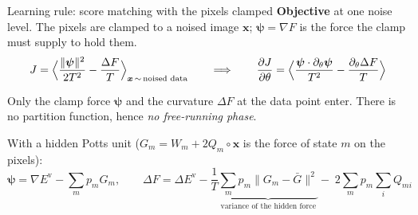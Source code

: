 \documentclass[aspectratio=169,10pt]{beamer}
\newcommand{\x}{\bm{x}}
\begin{document}
\begin{frame}{Learning rule: score matching with the pixels clamped}
  \textbf{Objective} at one noise level. The pixels are clamped to a noised image $\x$;
  $\bm\psi=\nabla F$ is the force the clamp must supply to hold them.
  \[
    J=\Bigl\langle\frac{\lVert\bm\psi\rVert^{2}}{2T^{2}}-\frac{\Delta F}{T}\Bigr\rangle_{\x\,\sim\,\text{noised data}}
    \qquad\Longrightarrow\qquad
    \frac{\partial J}{\partial\theta}=\Bigl\langle\frac{\bm\psi\cdot\partial_\theta\bm\psi}{T^{2}}-\frac{\partial_\theta\Delta F}{T}\Bigr\rangle
  \]
  \vspace{0.1cm}

  Only the clamp force $\bm\psi$ and the curvature $\Delta F$ at the data point enter.
  There is no partition function, hence \emph{no free-running phase}.

  \vspace{0.5cm}

  With a hidden Potts unit ($G_m=W_m+2Q_m\!\circ\!\x$ is the force of state $m$ on the pixels):
  \[
    \bm\psi=\nabla E^{\mathrm v}-\sum_m p_m G_m,
    \qquad
    \Delta F=\Delta E^{\mathrm v}-\frac{1}{T}\underbrace{\sum_m p_m\lVert G_m-\bar G\rVert^{2}}_{\text{variance of the hidden force}}-\;2\sum_m p_m\sum_i Q_{mi}
  \]
\end{frame}
\end{document}
